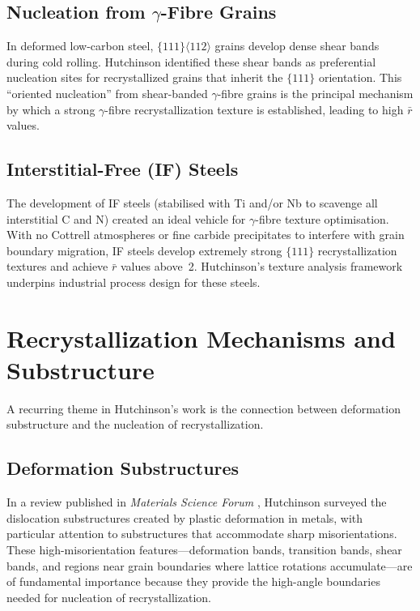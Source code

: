 \documentclass[11pt,a4paper]{article}
\begin{document}
\subsection{Nucleation from $\gamma$-Fibre Grains}

In deformed low-carbon steel, $\{111\}\langle 112\rangle$ grains develop
dense shear bands during cold rolling.  Hutchinson identified these
shear bands as preferential nucleation sites for recrystallized grains
that inherit the $\{111\}$ orientation.  This ``oriented nucleation''
from shear-banded $\gamma$-fibre grains is the principal mechanism by
which a strong $\gamma$-fibre recrystallization texture is established,
leading to high $\bar{r}$ values.

\subsection{Interstitial-Free (IF) Steels}

The development of IF steels (stabilised with Ti and/or Nb to scavenge
all interstitial C and N) created an ideal vehicle for
$\gamma$-fibre texture optimisation.  With no Cottrell atmospheres or
fine carbide precipitates to interfere with grain boundary migration, IF
steels develop extremely strong $\{111\}$ recrystallization textures and
achieve $\bar{r}$ values above~2.  Hutchinson's texture analysis
framework underpins industrial process design for these steels.

\section{Recrystallization Mechanisms and Substructure}
\label{sec:rex}

A recurring theme in Hutchinson's work is the connection between
deformation substructure and the nucleation of recrystallization.

\subsection{Deformation Substructures}

In a review published in \emph{Materials Science Forum}
\cite{Hutchinson2007MSF}, Hutchinson surveyed the dislocation
substructures created by plastic deformation in metals, with particular
attention to substructures that accommodate sharp misorientations.  These
high-misorientation features---deformation bands, transition bands,
shear bands, and regions near grain boundaries where lattice rotations
accumulate---are of fundamental importance because they provide the
high-angle boundaries needed for nucleation of recrystallization.
\end{document}
